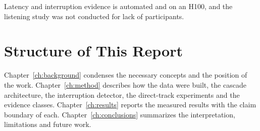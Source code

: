 Latency and interruption evidence is automated and on an H100, and the listening
study was not conducted for lack of participants.

\section{Structure of This Report}

Chapter~\ref{ch:background} condenses the necessary concepts and the position of
the work. Chapter~\ref{ch:method} describes how the data were built, the cascade
architecture, the interruption detector, the direct-track experiments and the
evidence classes. Chapter~\ref{ch:results} reports the measured results with the
claim boundary of each. Chapter~\ref{ch:conclusions} summarizes the
interpretation, limitations and future work.
